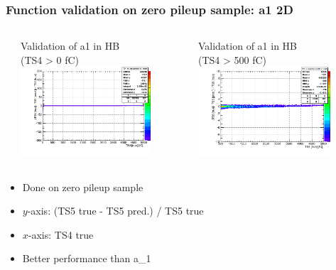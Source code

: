\documentclass[bigger]{beamer}
\begin{document}
\begin{frame}
\frametitle{Function validation on zero pileup sample: a1 2D}
\label{sec-3-2-7}
\begin{columns} %
\label{sec-3-2-7-1}
\begin{column}{0.55\textwidth}
\label{sec-3-2-7-1-1}

\centering
Validation of a1 in HB \\ (TS4 > 0 fC)
\includegraphics[width=0.8\textwidth]{fig/crosscheck_a1_0.png}
\end{column}
\begin{column}{0.55\textwidth}
\label{sec-3-2-7-1-2}

\centering
Validation of a1 in HB \\ (TS4 > 500 fC)
\includegraphics[width=0.8\textwidth]{fig/crosscheck_over500_a1_0.png}
\end{column}
\end{columns}
\label{sec-3-2-7-2}
\begin{itemize}

\item Done on zero pileup sample
\label{sec-3-2-7-2-1}%

\item $y$-axis: (TS5 true - TS5 pred.) / TS5 true
\label{sec-3-2-7-2-2}%

\item $x$-axis: TS4 true
\label{sec-3-2-7-2-3}%

\item Better performance than a\_1
\label{sec-3-2-7-2-4}%
\end{itemize} %
\end{frame}
\end{document}

